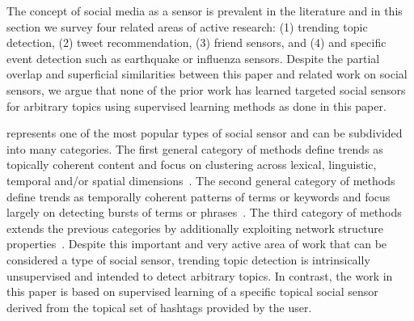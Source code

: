 %
%
%
%
%

The concept of social media as a sensor is prevalent in the literature
and in this section we survey four related areas of active research:
(1) trending topic detection, (2) tweet recommendation, (3) friend
sensors, and (4) and specific event detection such as earthquake or
influenza sensors.  Despite the partial overlap and superficial
similarities between this paper and related work on social sensors, we
argue that none of the prior work has learned targeted social sensors
for arbitrary topics using supervised learning methods as done in this
paper.

\vspace{2mm}
 represents one of the most popular
types of social sensor and can be subdivided into many categories.  The
first general category of methods define trends as topically coherent
content and focus on clustering across lexical, linguistic, temporal
and/or spatial
dimensions~\cite{petrovic,ishikawa,murata,becker,tweetmotif,wangLee}.
The second general category of methods define trends as temporally
coherent patterns of terms or keywords and focus largely on detecting
bursts of terms or
phrases~\cite{mathioudakis,cuiZhang,zhaoSports,nichols,aiello}.
%
The third category of methods extends the previous categories by
additionally exploiting network structure properties~\cite{budak}.
Despite this important and very active area of work that can be
considered a type of social sensor, trending topic detection is
intrinsically unsupervised and intended to detect arbitrary topics.
In contrast, the work in this paper is based on supervised learning of
a specific topical social sensor derived from the topical set of
hashtags provided by the user.

